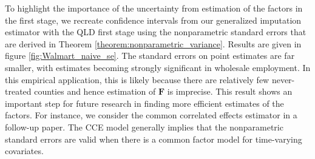 \documentclass[12pt]{article}
\begin{document}
To highlight the importance of the uncertainty from estimation of the factors in the first stage, we recreate confidence intervals from our generalized imputation estimator with the QLD first stage using the nonparametric standard errors that are derived in Theorem \ref{theorem:nonparametric_variance}. Results are given in figure \ref{fig:Walmart_naive_se}. The standard errors on point estimates are far smaller, with estimates becoming strongly significant in wholesale employment. In this empirical application, this is likely because there are relatively few never-treated counties and hence estimation of $\bm{F}$ is imprecise. This result shows an important step for future research in finding more efficient estimates of the factors. For instance, we consider the common correlated effects estimator in a follow-up paper. The CCE model generally implies that the nonparametric standard errors are valid when there is a common factor model for time-varying covariates.
\end{document}
